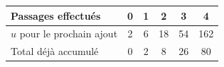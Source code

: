 \begingroup\renewcommand{\arraystretch}{1.35}
\begin{tabular}{@{}lccccc@{}}\toprule
Passages effectués & 0 & 1 & 2 & 3 & 4\\\midrule
$u$ pour le prochain ajout & 2 & 6 & 18 & 54 & 162\\
Total déjà accumulé & 0 & 2 & 8 & 26 & 80\\
\bottomrule\end{tabular}\endgroup

\par\smallskip{}

